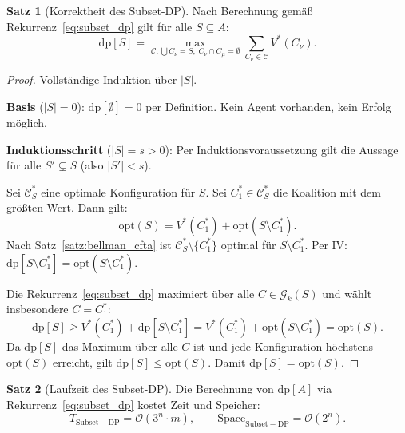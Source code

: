 \documentclass[a4paper,12pt]{article}
\theoremstyle{definition}
\newtheorem{satz}{Satz}
\begin{document}
\begin{satz}[Korrektheit des Subset-DP]
    \label{satz:subset_correct}
    Nach Berechnung gem\"{a}{\ss} Rekurrenz~\eqref{eq:subset_dp} gilt f\"{u}r alle
    $S \subseteq A$:
    \[
        \mathrm{dp}[S] = \max_{\mathcal{C}: \bigcup C_\nu = S,\; C_\nu \cap C_\mu = \emptyset}
        \sum_{C_\nu \in \mathcal{C}} V^*(C_\nu).
    \]
\end{satz}

\begin{proof}
    Vollst\"{a}ndige Induktion \"{u}ber $|S|$.

    \textbf{Basis} ($|S| = 0$): $\mathrm{dp}[\emptyset] = 0$ per Definition.
    Kein Agent vorhanden, kein Erfolg m\"{o}glich. \checkmark

    \textbf{Induktionsschritt} ($|S| = s > 0$):
    Per Induktionsvoraussetzung gilt die Aussage f\"{u}r alle
    $S' \subsetneq S$ (also $|S'| < s$).

    Sei $\mathcal{C}^*_S$ eine optimale Konfiguration f\"{u}r $S$.
    Sei $C_1^* \in \mathcal{C}^*_S$ die Koalition mit dem gr\"{o}{\ss}ten Wert.
    Dann gilt:
    \[
        \mathrm{opt}(S) = V^*(C_1^*) + \mathrm{opt}(S \setminus C_1^*).
    \]
    Nach Satz~\ref{satz:bellman_cfta} ist $\mathcal{C}^*_S \setminus \{C_1^*\}$
    optimal f\"{u}r $S \setminus C_1^*$. Per IV:
    $\mathrm{dp}[S \setminus C_1^*] = \mathrm{opt}(S \setminus C_1^*)$.

    Die Rekurrenz~\eqref{eq:subset_dp} maximiert \"{u}ber alle
    $C \in \mathcal{G}_k(S)$ und w\"{a}hlt insbesondere $C = C_1^*$:
    \[
        \mathrm{dp}[S] \geq V^*(C_1^*) + \mathrm{dp}[S \setminus C_1^*]
        = V^*(C_1^*) + \mathrm{opt}(S \setminus C_1^*) = \mathrm{opt}(S).
    \]
    Da $\mathrm{dp}[S]$ das Maximum \"{u}ber alle $C$ ist und jede Konfiguration
    h\"{o}chstens $\mathrm{opt}(S)$ erreicht, gilt $\mathrm{dp}[S] \leq \mathrm{opt}(S)$.
    Damit $\mathrm{dp}[S] = \mathrm{opt}(S)$. \qedhere
\end{proof}

\begin{satz}[Laufzeit des Subset-DP]
    \label{satz:subset_runtime}
    Die Berechnung von $\mathrm{dp}[A]$ via Rekurrenz~\eqref{eq:subset_dp}
    kostet Zeit und Speicher:
    \[
        T_{\mathrm{Subset-DP}} = \mathcal{O}(3^n \cdot m),
        \qquad
        \mathrm{Space}_{\mathrm{Subset-DP}} = \mathcal{O}(2^n).
    \]
\end{satz}
\end{document}
